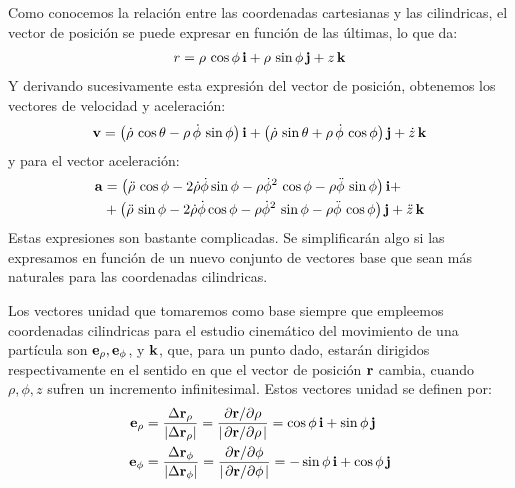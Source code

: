 \documentclass[12pt]{article}
\begin{document}
Como conocemos la relación entre las coordenadas cartesianas y las cilindricas, el vector de posición se puede expresar en función de las últimas, lo que da:
\begin{align}
r = \rho \, \cos \phi \, \vb{i} + \rho \, \sin \phi \, \vb{j} + z \, \vb{k}
\label{eq:ecuacion_02_11} 
\end{align}
Y derivando sucesivamente esta expresión del vector de posición, obtenemos los vectores de velocidad y aceleración:
\begin{align}
\vb{v} = \left( \dot{\rho} \, \cos \theta - \rho \, \dot{\phi} \, \sin \phi \right) \vb{i} + \left( \dot{\rho} \, \sin \theta + \rho \, \dot{\phi} \, \cos \phi \right) \vb{j} + \dot{z} \, \vb{k}
\label{eq:ecuacion_02_12}
\end{align}
y para el vector aceleración:
\begin{align}
\begin{aligned}
\vb{a} &= \left( \ddot{\rho} \, \cos \phi - 2 \dot{\rho} \dot{\phi} \sin \phi - \rho \dot{\phi}^{2} \, \cos \phi - \rho \ddot{\phi} \, \sin \phi \right) \vb{i} + \\
&+ \left( \ddot{\rho} \, \sin \phi - 2 \dot{\rho} \dot{\phi} \cos \phi - \rho \dot{\phi}^{2} \, \sin \phi - \rho \ddot{\phi} \, \cos \phi \right) \vb{j} + \ddot{z} \, \vb{k}
\end{aligned}
\label{eq:ecuacion_02_13}
\end{align}
Estas expresiones son bastante complicadas. Se simplificarán algo si las expresamos en función de un nuevo conjunto de vectores base que sean más naturales para las coordenadas cilindricas. 
\par
Los vectores unidad que tomaremos como base siempre que empleemos coordenadas cilindricas para el estudio cinemático del movimiento de una partícula son $\vb{e}_{\rho}, \vb{e}_{\phi}$, y $\vb{k}$, que, para un punto dado, estarán dirigidos respectivamente en el sentido en que el vector de posición $\vb{r}$ cambia, cuando $\rho, \phi, z$ sufren un incremento infinitesimal. Estos vectores unidad se definen por:
\begin{align}
\vb{e}_{\rho} &= \dfrac{\Delta \vb{r}_{\rho}}{\abs{\Delta \vb{r}_{\rho}}} = \dfrac{\pdv*{\vb{r}}{\rho}}{\abs{\pdv*{\vb{r}}{\rho}}} = \cos \phi \, \vb{i} + \sin \phi \, \vb{j} \label{eq:ecuacion_02_14} \\
\vb{e}_{\phi} &= \dfrac{\Delta \vb{r}_{\phi}}{\abs{\Delta \vb{r}_{\phi}}} = \dfrac{\pdv*{\vb{r}}{\phi}}{\abs{\pdv*{\vb{r}}{\phi}}} = - \sin \phi \, \vb{i} + \cos \phi \, \vb{j} \label{eq:ecuacion_02_15}
\end{align}
\end{document}
